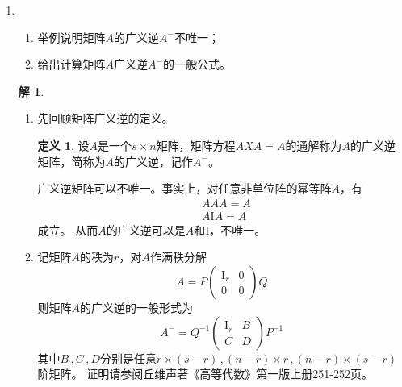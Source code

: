 \documentclass[10pt]{article}
\theoremstyle{definition}
\newtheorem*{solution}{解}
\theoremstyle{definition}
\newtheorem*{definition}{定义}
\begin{document}
\begin{enumerate}
    \item	%
        \begin{enumerate}[label=(\roman*)]
            \item 举例说明矩阵$A$的广义逆$A^-$不唯一；
            \item 给出计算矩阵$A$广义逆$A^-$的一般公式。 
        \end{enumerate}

        \begin{solution}
            \begin{enumerate}[label=(\roman*)]
                \item
                    先回顾矩阵广义逆的定义。
                    \begin{definition}
                        设$A$是一个$s\times n$矩阵，矩阵方程$AXA=A$的通解称为$A$的广义逆矩阵，简称为$A$的广义逆，记作$A^{-}$。
                    \end{definition}
                    广义逆矩阵可以不唯一。事实上，对任意非单位阵的幂等阵$A$，有
                    \begin{equation*}
                        \begin{aligned}
        & AAA=A \\
        & A\mathrm{I}A=A
                        \end{aligned}
                    \end{equation*}
                    成立。
                    从而$A$的广义逆可以是$A$和$\mathrm{I}$，不唯一。
                \item
                    记矩阵$A$的秩为$r$，对$A$作满秩分解
                    \begin{equation*}
                        A=P
                        \begin{pmatrix}
                            \mathrm{I}_r & 0 \\
                            0 & 0
                        \end{pmatrix}Q
                    \end{equation*}
                    则矩阵$A$的广义逆的一般形式为
                    \begin{equation*}
                        A^-=Q^{-1}
                        \begin{pmatrix}
                            \mathrm{I}_r & B \\
                            C & D 
                        \end{pmatrix}P^{-1}
                    \end{equation*}
                    其中$B\, ,C\, ,D$分别是任意$r\times (s-r)\, ,(n-r)\times r\, ,(n-r)\times (s-r)$阶矩阵。
                    证明请参阅丘维声著《高等代数》第一版上册251-252页。
            \end{enumerate}
        \end{solution}


\end{enumerate}
\end{document}
